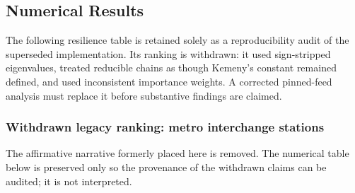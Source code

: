 \documentclass[11pt,a4paper]{article}
\theoremstyle{plain}
\theoremstyle{definition}
\theoremstyle{remark}
\begin{document}
\subsection{Numerical Results}

The following resilience table is retained solely as a reproducibility audit
of the superseded implementation.  Its ranking is withdrawn: it used
sign-stripped eigenvalues, treated reducible chains as though Kemeny's constant
remained defined, and used inconsistent importance weights.  A corrected
pinned-feed analysis must replace it before substantive findings are claimed.

\subsubsection{Withdrawn legacy ranking: metro interchange stations}
\label{sec:finding1}

The affirmative narrative formerly placed here is removed.  The numerical
table below is preserved only so the provenance of the withdrawn claims can be
audited; it is not interpreted.
\end{document}
